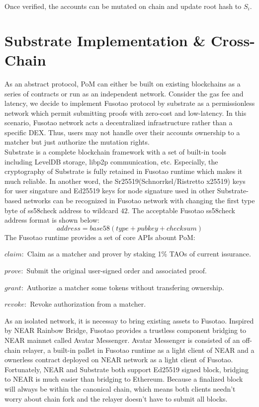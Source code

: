 \documentclass[a4paper,12pt]{article}
\begin{document}
Once verified, the accounts can be mutated on chain and update root hash to \(S_{i}\).\\
\section{Substrate Implementation \& Cross-Chain}
\label{sec:orge2652f5}
As an abstract protocol, PoM can either be built on existing blockchains as a series of contracts or run as an independent network. Consider the gas fee and latency, we decide to implement Fusotao protocol by substrate as a permissionless network which permit submitting proofs with zero-cost and low-latency. In this scenario, Fusotao network acts a decentralized infrastructure rather than a specific DEX. Thus, users may not handle over their accounts ownership to a matcher but just authorize the mutation rights.\\
Substrate is a complete blockchain framework with a set of built-in tools including LevelDB storage, libp2p communication, etc. Especially, the cryptography of Substrate is fully retained in Fusotao runtime which makes it much reliable. In another word, the Sr25519(Schnorrkel/Ristretto x25519) keys for user singature and Ed25519 keys for node signature used in other Substrate-based networks can be recognized in Fusotao network with changing the first type byte of ss58check address to wildcard \(42\). The acceptable Fusotao ss58check address format is shown below:\\
\begin{equation*}
address = base58(type+pubkey+checksum)
\end{equation*}
The Fusotao runtime provides a set of core APIs abount PoM:\\
\begin{itemize*}
    \item $claim:$ Claim as a matcher and prover by staking 1\% TAOs of current issurance.
    \item $prove:$ Submit the original user-signed order and associated proof.
    \item $grant:$ Authorize a matcher some tokens without transfering ownership.
    \item $revoke:$ Revoke authorization from a matcher.
\end{itemize*}

As an isolated network, it is necessay to bring existing assets to Fusotao. Inspired by NEAR Rainbow Bridge, Fusotao provides a trustless component bridging to NEAR mainnet called Avatar Messenger. Avatar Messenger is consisted of an off-chain relayer, a built-in pallet in Fusotao runtime as a light client of NEAR and a ownerless contract deployed on NEAR network as a light client of Fusotao. Fortunately, NEAR and Substrate both support Ed25519 signed block, bridging to NEAR is much easier than bridging to Ethereum. Because a finalized block will always be within the canonical chain, which means both clients needn't worry about chain fork and the relayer doesn't have to submit all blocks.\\
\end{document}
